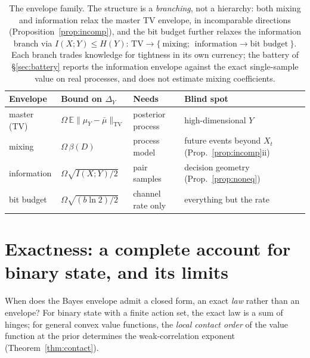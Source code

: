 \documentclass[acmsmall,screen,review,anonymous]{acmart}
\newcommand{\TV}{\mathrm{TV}}
\newcommand{\E}{\mathbb{E}}
\begin{document}
\begin{table}[!ht]\centering\small
\begin{tabular}{llll}
\toprule
Envelope & Bound on $\Delta_Y$ & Needs & Blind spot \\
\midrule
master (TV) & $\Omega\,\E\|\mu_Y-\bar\mu\|_{\TV}$ & posterior process & high-dimensional $Y$ \\
mixing & $\Omega\,\beta(D)$ & process model & future events beyond $X_t$ (Prop.~\ref{prop:incomp}ii) \\
information & $\Omega\sqrt{I(X;Y)/2}$ & pair samples & decision geometry (Prop.~\ref{prop:noneq}) \\
bit budget & $\Omega\sqrt{(b\ln 2)/2}$ & channel rate only & everything but the rate \\
\bottomrule
\end{tabular}
\caption{The envelope family. The structure is a \emph{branching}, not a
hierarchy: both mixing and information relax the master TV envelope, in
incomparable directions (Proposition~\ref{prop:incomp}), and the bit budget
further relaxes the information branch via
$I(X;Y)\le H(Y)$:
$\text{TV} \rightarrow \{\ \text{mixing};\ \ \text{information}
\rightarrow \text{bit budget}\ \}$. Each branch trades knowledge for
tightness in its own currency; the battery of \S\ref{sec:battery} reports
the information envelope against the exact single-sample value on real
processes, and does not estimate mixing coefficients.}
\label{tab:envelopes}
\end{table}

\section{Exactness: a complete account for binary state, and its limits}
\label{sec:multistate}

When does the Bayes envelope admit a closed form, an exact \emph{law}
rather than an envelope? For binary state with a finite action set, the
exact law is a sum of hinges; for general convex value functions, the
\emph{local contact order} of the value function at the prior determines
the weak-correlation exponent (Theorem~\ref{thm:contact}).
\end{document}
